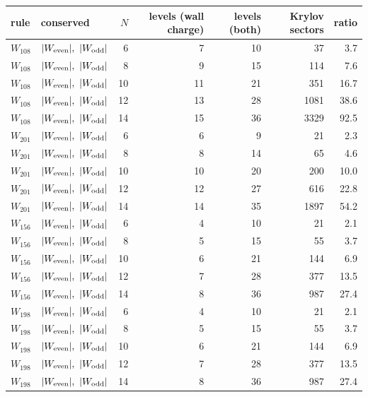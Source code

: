 \begin{tabular}{llrrrrr}
\toprule
rule & conserved & $N$ & levels (wall charge) & levels (both) & Krylov sectors & ratio \\
\midrule
$W_{108}$ & $|W_{\rm even}|,\ |W_{\rm odd}|$ & 6 & 7 & 10 & 37 & 3.7 \\
$W_{108}$ & $|W_{\rm even}|,\ |W_{\rm odd}|$ & 8 & 9 & 15 & 114 & 7.6 \\
$W_{108}$ & $|W_{\rm even}|,\ |W_{\rm odd}|$ & 10 & 11 & 21 & 351 & 16.7 \\
$W_{108}$ & $|W_{\rm even}|,\ |W_{\rm odd}|$ & 12 & 13 & 28 & 1081 & 38.6 \\
$W_{108}$ & $|W_{\rm even}|,\ |W_{\rm odd}|$ & 14 & 15 & 36 & 3329 & 92.5 \\
$W_{201}$ & $|W_{\rm even}|,\ |W_{\rm odd}|$ & 6 & 6 & 9 & 21 & 2.3 \\
$W_{201}$ & $|W_{\rm even}|,\ |W_{\rm odd}|$ & 8 & 8 & 14 & 65 & 4.6 \\
$W_{201}$ & $|W_{\rm even}|,\ |W_{\rm odd}|$ & 10 & 10 & 20 & 200 & 10.0 \\
$W_{201}$ & $|W_{\rm even}|,\ |W_{\rm odd}|$ & 12 & 12 & 27 & 616 & 22.8 \\
$W_{201}$ & $|W_{\rm even}|,\ |W_{\rm odd}|$ & 14 & 14 & 35 & 1897 & 54.2 \\
$W_{156}$ & $|W_{\rm even}|,\ |W_{\rm odd}|$ & 6 & 4 & 10 & 21 & 2.1 \\
$W_{156}$ & $|W_{\rm even}|,\ |W_{\rm odd}|$ & 8 & 5 & 15 & 55 & 3.7 \\
$W_{156}$ & $|W_{\rm even}|,\ |W_{\rm odd}|$ & 10 & 6 & 21 & 144 & 6.9 \\
$W_{156}$ & $|W_{\rm even}|,\ |W_{\rm odd}|$ & 12 & 7 & 28 & 377 & 13.5 \\
$W_{156}$ & $|W_{\rm even}|,\ |W_{\rm odd}|$ & 14 & 8 & 36 & 987 & 27.4 \\
$W_{198}$ & $|W_{\rm even}|,\ |W_{\rm odd}|$ & 6 & 4 & 10 & 21 & 2.1 \\
$W_{198}$ & $|W_{\rm even}|,\ |W_{\rm odd}|$ & 8 & 5 & 15 & 55 & 3.7 \\
$W_{198}$ & $|W_{\rm even}|,\ |W_{\rm odd}|$ & 10 & 6 & 21 & 144 & 6.9 \\
$W_{198}$ & $|W_{\rm even}|,\ |W_{\rm odd}|$ & 12 & 7 & 28 & 377 & 13.5 \\
$W_{198}$ & $|W_{\rm even}|,\ |W_{\rm odd}|$ & 14 & 8 & 36 & 987 & 27.4 \\
\bottomrule
\end{tabular}
